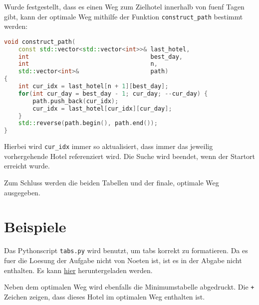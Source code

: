 \documentclass[a4paper,10pt,ngerman]{scrartcl}
\begin{document}
Wurde festgestellt, dass es einen Weg zum \glqq{}Zielhotel\grqq{} innerhalb von fuenf Tagen gibt, kann der optimale Weg mithilfe der Funktion \lstinline{construct_path} bestimmt werden:
\begin{lstlisting}[language=C++]
void construct_path(
    const std::vector<std::vector<int>>& last_hotel,
    int                                  best_day,
    int                                  n,
    std::vector<int>&                    path)
{
    int cur_idx = last_hotel[n + 1][best_day];
    for(int cur_day = best_day - 1; cur_day; --cur_day) {
        path.push_back(cur_idx);
        cur_idx = last_hotel[cur_idx][cur_day];
    }
    std::reverse(path.begin(), path.end());
}
\end{lstlisting}
Hierbei wird \lstinline{cur_idx} immer so aktualisiert, dass immer das jeweilig vorhergehende Hotel referenziert wird.
Die Suche wird beendet, wenn der Startort erreicht wurde.

Zum Schluss werden die beiden Tabellen und der finale, optimale Weg ausgegeben.

\section{Beispiele}
Das Pythonscript \lstinline{tabs.py} wird benutzt, um tabs korrekt zu formatieren.
Da es fuer die Loesung der Aufgabe nicht von Noeten ist, ist es in der Abgabe nicht enthalten.
Es kann \href{https://gist.github.com/christopher-besch/d88a059a621e3e4a26983b3db576e48d}{hier} heruntergeladen werden.

Neben dem optimalen Weg wird ebenfalls die Minimumstabelle abgedruckt.
Die \lstinline{+} Zeichen zeigen, dass dieses Hotel im optimalen Weg enthalten ist.
\end{document}
